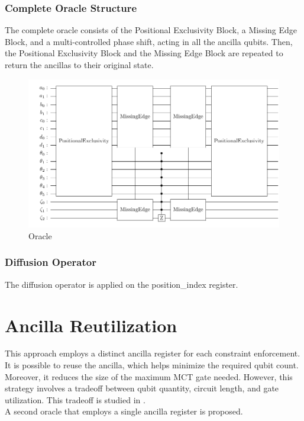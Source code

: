 \documentclass[10pt,a4paper]{article}
\begin{document}
\subsubsection*{Complete Oracle Structure}
The complete oracle consists of the Positional Exclusivity Block, a Missing Edge Block, and a multi-controlled phase shift, acting in all the ancilla qubits. Then, the Positional Exclusivity Block and the Missing Edge Block are repeated to return the ancillas to their original state.

\begin{figure}[hbtp]
\caption{Oracle}
\centering
\includegraphics[scale=0.6]{figures/oracle.pdf}
\end{figure}

\subsubsection*{Diffusion Operator}

The diffusion operator is applied on the position\_index register.

\section{Ancilla Reutilization}
This approach employs a distinct ancilla register for each constraint enforcement. It is possible to reuse the ancilla, which helps minimize the required qubit count. Moreover, it reduces the size of the maximum MCT gate needed. However, this strategy involves a tradeoff between qubit quantity, circuit length, and gate utilization. This tradeoff is studied in \cite{SAT_paralel}.\\
A second oracle that employs a single ancilla register is proposed.
\end{document}
